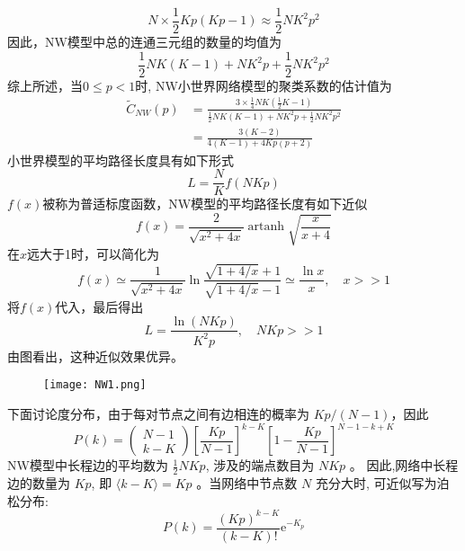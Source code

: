 \begin{equation}
    N \times \frac{1}{2} K p(K p-1) \approx \frac{1}{2} N K^2 p^2
\end{equation}
因此，NW模型中总的连通三元组的数量的均值为
\begin{equation}
    \frac{1}{2} N K(K-1)+N K^2 p+\frac{1}{2} N K^2 p^2
\end{equation}
综上所述，当$0 \leqslant p<1$时, NW小世界网络模型的聚类系数的估计值为
\begin{equation}
    \begin{aligned}
    \tilde{C}_{N W}(p) & =\frac{3 \times \frac{1}{4} N K\left(\frac{1}{2} K-1\right)}{\frac{1}{2} N K(K-1)+N K^2 p+\frac{1}{2} N K^2 p^2} \\
    & =\frac{3(K-2)}{4(K-1)+4 K p(p+2)} 
    \end{aligned}
\end{equation}
小世界模型的平均路径长度具有如下形式
\begin{equation}
    L=\frac{N}{K} f(N K p)
\end{equation}
$f(x)$被称为普适标度函数，NW模型的平均路径长度有如下近似
\begin{equation}
    f(x)=\frac{2}{\sqrt{x^2+4 x}} \operatorname{artanh} \sqrt{\frac{x}{x+4}}
\end{equation}
在$x$远大于1时，可以简化为
\begin{equation}
    f(x) \simeq \frac{1}{\sqrt{x^2+4 x}} \ln \frac{\sqrt{1+4 / x}+1}{\sqrt{1+4 / x}-1} \simeq \frac{\ln x}{x}, \quad x>>1
\end{equation}
将$f(x)$代入，最后得出
\begin{equation}
    L=\frac{\ln (N K p)}{K^2 p}, \quad N K p>>1
\end{equation}
由图看出，这种近似效果优异。\par
\begin{figure}[!htbp]
    \centering
    \texttt{[image: NW1.png]}
\end{figure}
下面讨论度分布，由于每对节点之间有边相连的概率为 $Kp/(N-1)$，因此
\begin{equation}
    P(k)=\left(\begin{array}{l}
    N-1 \\
    k-K
    \end{array}\right)\left[\frac{K p}{N-1}\right]^{k-K}\left[1-\frac{K p}{N-1}\right]^{N-1-k+K}
\end{equation}
NW模型中长程边的平均数为 $\frac{1}{2} N K p$, 涉及的端点数目为 $N K p$ 。
因此,网络中长程边的数量为 $K p$, 
即 $\langle k-K\rangle=K p$ 。当网络中节点数 $N$ 充分大时, 可近似写为泊松分布:
\begin{equation}
    P(k)=\frac{(K p)^{k-K}}{(k-K) !} \mathrm{e}^{-K_p}
\end{equation}
